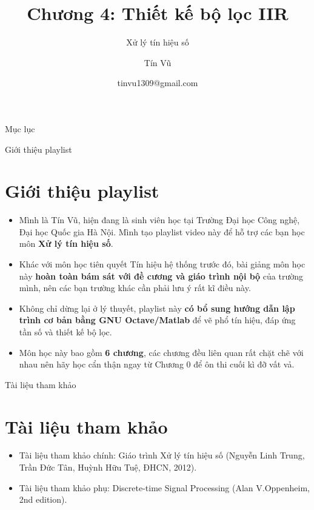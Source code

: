 \documentclass[8pt]{beamer}
\title[Chương 4: Thiết kế bộ lọc IIR] %
{Chương 4: Thiết kế bộ lọc IIR}
\subtitle{Xử lý tín hiệu số}
\author[Xử lý tín hiệu số] %
{Tín Vũ}
\date[VLC 2021] %
{tinvu1309@gmail.com}
\begin{document}
\frame{\titlepage}
\begin{frame}{Mục lục}
\tableofcontents
\end{frame}
\begin{frame}{Giới thiệu playlist}
\section{Giới thiệu playlist}
	\begin{itemize}
		\item Mình là Tín Vũ, hiện đang là sinh viên học tại Trường Đại học Công nghệ, Đại học Quốc gia Hà Nội. Mình tạo playlist video này để hỗ trợ các bạn học môn \textbf{Xử lý tín hiệu số}.
\item Khác với môn học tiên quyết \alert{Tín hiệu hệ thống} trước đó, bài giảng môn học này \textbf{hoàn toàn bám sát với đề cương và giáo trình nội bộ} của trường mình, nên các bạn trường khác cần phải lưu ý rất kĩ điều này.
\item Không chỉ dừng lại ở lý thuyết, playlist này \textbf{có bổ sung hướng dẫn lập trình cơ bản bằng GNU Octave/Matlab} để vẽ phổ tín hiệu, đáp ứng tần số và thiết kế bộ lọc.
\item Môn học này bao gồm \textbf{6 chương}, các chương đều liên quan rất chặt chẽ với nhau nên hãy học cẩn thận ngay từ \alert{Chương 0} để ôn thi cuối kì đỡ vất vả.
	\end{itemize}
\end{frame}
\begin{frame}{Tài liệu tham khảo}
\section{Tài liệu tham khảo}
\begin{itemize}
		\item Tài liệu tham khảo chính: Giáo trình Xử lý tín hiệu số (Nguyễn Linh Trung, Trần Đức Tân, Huỳnh Hữu Tuệ, ĐHCN, 2012).
		\item Tài liệu tham khảo phụ: Discrete-time Signal Processing (Alan V.Oppenheim, 2nd edition). 
	\end{itemize}
\end{frame}
\end{document}
